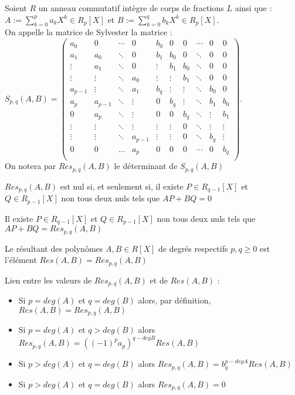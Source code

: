 Soient $R$ un anneau commutatif intègre de corps de fractions $L$ ainsi que : \\
$A:=\sum_{k=0}^p a_kX^k \in R_p[X]$ et $B:=\sum_{k=0}^q b_kX^k \in R_p[X]$.\\
On appelle la matrice de Sylvester la matrice : \\
$S_{p,q}(A,B)=\begin{pmatrix}
a_0 & 0 &\cdots & 0 & b_0 & 0 &0 & \cdots & 0 & 0 \\
a_1 & a_0& \ddots & 0 &b_1 & b_0 &0 & \ddots & 0 & 0 \\
\vdots & a_1 &\ddots & 0 &\vdots & b_1 &b_0 & \ddots & 0 & 0 \\
\vdots & \vdots &\ddots & a_0 &\vdots & \vdots & b_1 & \ddots & 0 & 0 \\
a_ {p-1} & \vdots& \ddots & a_1 &b_q & \vdots &\vdots & \ddots & b_0 & 0 \\
a_p & a_{p-1} &\ddots & \vdots &0 & b_q &\vdots & \ddots & b_1 & b_0 \\
0 & a_p &\ddots & \vdots &0 & 0 &b_q & \ddots & \vdots & b_1 \\
\vdots & \vdots &\ddots & \vdots &\vdots & \vdots &0 & \ddots & \vdots & \vdots \\
\vdots & \vdots &\ddots & a_{p-1} &\vdots & \vdots &0 & \ddots & b_q & \vdots \\
0 & 0& \ldots & a_p &0 & 0 &0 & \cdots & 0 & b_q \\
\end{pmatrix}$. \\
On notera par $Res_{p,q}(A,B)$ le déterminant de $S_{p,q}(A,B)$
\begin{prop}
$Res_{p,q}(A,B)$ est nul si, et seulement si, il existe $P \in R_{q-1}[X]$ et $Q \in R_{p-1}[X]$ non tous deux nuls tels que $AP+BQ=0$
\end{prop}
\begin{prop}
Il existe $P \in R_{q-1}[X]$ et $Q \in R_{p-1}[X]$ non tous deux nuls tels que $AP+BQ=Res_{p,q}(A,B)$
\end{prop}
\begin{Def}
Le résultant des polynômes $A,B \in R[X]$ de degrés respectifs $p,q \geq 0$ est l'élément $Res(A,B)=Res_{p,q}(A,B)$
\end{Def}
\begin{Rq}
Lien entre les valeurs de $Res_{p,q}(A,B)$ et de $Res(A,B)$ : 
\begin{itemize}
    \item Si $p=deg(A)$ et $q=deg(B)$ alors, par définition, $Res(A,B)=Res_{p,q}(A,B)$
    \item Si $p=deg(A)$ et $q>deg(B)$ alors $Res_{p,q}(A,B)=((-1)^p a_p)^{q-deg B}Res(A,B)$
    \item Si $p>deg(A)$ et $q=deg(B)$ alors $Res_{p,q}(A,B)=b_q^{p-deg A}Res(A,B)$
    \item Si $p>deg(A)$ et $q=deg(B)$ alors $Res_{p,q}(A,B)=0$
\end{itemize}
\end{Rq}
